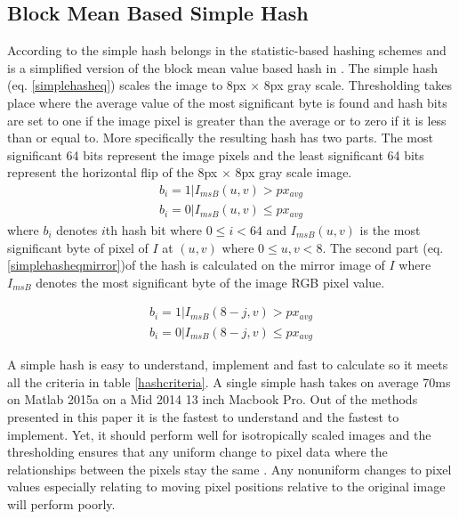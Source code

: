 \documentclass[english,12pt,a4paper,pdftex,elec,utf8, table]{aaltothesis}
\begin{document}
\subsection{Block Mean Based Simple Hash}\label{simplehash}
According to \cite[p. 20]{Hadmi2012} the simple hash belongs in the statistic-based hashing schemes and is a simplified version of the block mean value based hash in \cite{Yang2006}. The simple hash (eq. \ref{simplehasheq}) scales the image to 8px $\times$ 8px gray scale. Thresholding takes place where the average value of the most significant byte is found and hash bits are set to one if the image pixel is greater than the average or to zero if it is less than or equal to. More specifically the resulting hash has two parts. The most significant 64 bits represent the image pixels and the least significant 64 bits represent the horizontal flip of the 8px $\times$ 8px gray scale image.
\begin{equation} \label{simplehasheq}
  \begin{split}
  b_{i} = 1 | I_{msB}(u,v) > px_{avg}\\
  b_{i} = 0 | I_{msB}(u,v) \leq px_{avg}
  \end{split}
\end{equation}
where $b_{i}$ denotes $i$th hash bit where $0 \leq i < 64$ and $I_{msB}(u,v)$ is the most significant byte of pixel of $I$ at $(u,v)$ where $0 \leq u,v < 8$. The second part (eq. \ref{simplehasheqmirror})of the hash is calculated on the mirror image of $I$ where $I_{msB}$ denotes the most significant byte of the image RGB pixel value.

\begin{equation} \label{simplehasheqmirror}
  \begin{split}
  b_{i} = 1 | I_{msB}(8-j,v) > px_{avg}\\
  b_{i} = 0 | I_{msB}(8-j,v) \leq px_{avg}
  \end{split}
\end{equation}

A simple hash is easy to understand, implement and fast to calculate so it meets all the criteria in table \ref{hashcriteria}. A single simple hash takes on average 70ms on Matlab 2015a on a Mid 2014 13 inch Macbook Pro. Out of the methods presented in this paper it is the fastest to understand and the fastest to implement. Yet, it should perform well for isotropically scaled images and the thresholding ensures that any uniform change to pixel data where the relationships between the pixels stay the same \cite{Zauner2010}. Any nonuniform changes to pixel values especially relating to moving pixel positions relative to the original image will perform poorly.
\end{document}
